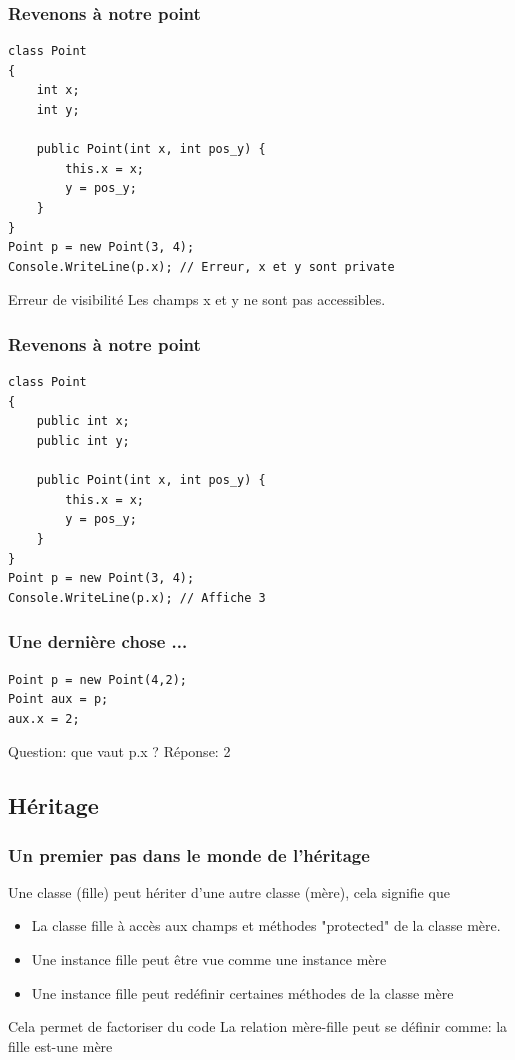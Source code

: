 \documentclass{beamer}
\begin{document}
\begin{frame}[fragile]
\frametitle{Revenons à notre point}
\begin{lstlisting}
class Point
{
    int x;
    int y;

    public Point(int x, int pos_y) {
        this.x = x;
        y = pos_y;
    }
}
Point p = new Point(3, 4);
Console.WriteLine(p.x); // Erreur, x et y sont private
\end{lstlisting}
\begin{alertblock}{Erreur de visibilité}
Les champs x et y ne sont pas accessibles.
\end{alertblock}
\end{frame}

\begin{frame}[fragile]
\frametitle{Revenons à notre point}
\begin{lstlisting}
class Point
{
    public int x;
    public int y;
    
    public Point(int x, int pos_y) {
        this.x = x;
        y = pos_y;
    }
}
Point p = new Point(3, 4);
Console.WriteLine(p.x); // Affiche 3
\end{lstlisting}
\end{frame}

\begin{frame}[fragile]
\frametitle{Une dernière chose ...}
\begin{lstlisting}
Point p = new Point(4,2);
Point aux = p;
aux.x = 2;
\end{lstlisting}
Question: que vaut p.x ? 
\pause
Réponse: 2
\end{frame}

\subsection{Héritage}
\begin{frame}
\frametitle{Un premier pas dans le monde de l'héritage}
Une classe (fille) peut hériter d'une autre classe (mère), cela signifie que
\begin{itemize}
\item La classe fille à accès aux champs et méthodes "protected" de la classe mère.
\item Une instance fille peut être vue comme une instance mère
\item Une instance fille peut redéfinir certaines méthodes de la classe mère
\end{itemize}
\pause
Cela permet de factoriser du code
\pause
La relation mère-fille peut se définir comme: la fille est-une mère
\end{frame}
\end{document}
